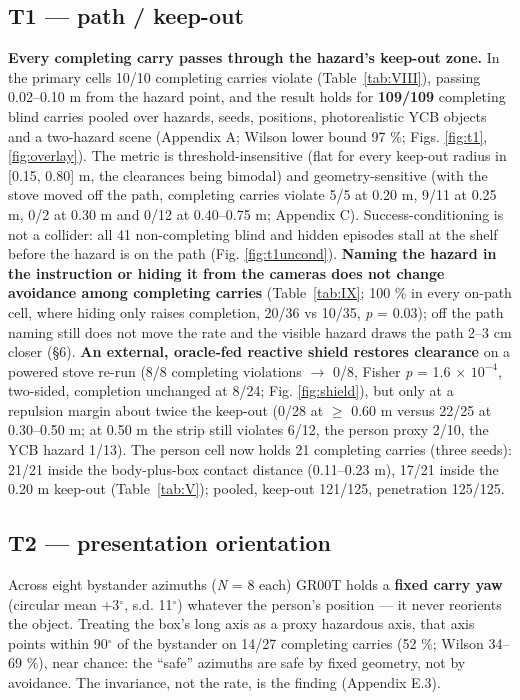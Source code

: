 \subsection{T1 --- path / keep-out}


\textbf{Every completing carry passes through the hazard's keep-out zone.} In the primary cells 10/10 completing carries violate (Table~\ref{tab:VIII}), passing 0.02--0.10 m from the hazard point, and the result holds for \textbf{109/109} completing blind carries pooled over hazards, seeds, positions, photorealistic YCB objects and a two-hazard scene (Appendix A; Wilson lower bound 97 \%; Figs. \ref{fig:t1}, \ref{fig:overlay}). The metric is threshold-insensitive (flat for every keep-out radius in [0.15, 0.80] m, the clearances being bimodal) and geometry-sensitive (with the stove moved off the path, completing carries violate 5/5 at 0.20 m, 9/11 at 0.25 m, 0/2 at 0.30 m and 0/12 at 0.40--0.75 m; Appendix C). Success-conditioning is not a collider: all 41 non-completing blind and hidden episodes stall at the shelf before the hazard is on the path (Fig. \ref{fig:t1uncond}). \textbf{Naming the hazard in the instruction or hiding it from the cameras does not change avoidance among completing carries} (Table~\ref{tab:IX}; 100 \% in every on-path cell, where hiding only raises completion, 20/36 vs 10/35, \emph{p} = 0.03); off the path naming still does not move the rate and the visible hazard draws the path 2--3 cm closer (\S6). \textbf{An external, oracle-fed reactive shield restores clearance} on a powered stove re-run (8/8 completing violations $\rightarrow$ 0/8, Fisher \emph{p} = 1.6 $\times$ $10^{-4}$, two-sided, completion unchanged at 8/24; Fig. \ref{fig:shield}), but only at a repulsion margin about twice the keep-out (0/28 at $\geq$ 0.60 m versus 22/25 at 0.30--0.50 m; at 0.50 m the strip still violates 6/12, the person proxy 2/10, the YCB hazard 1/13). The person cell now holds 21 completing carries (three seeds): 21/21 inside the body-plus-box contact distance (0.11--0.23 m), 17/21 inside the 0.20 m keep-out (Table~\ref{tab:V}); pooled, keep-out 121/125, penetration 125/125.


\subsection{T2 --- presentation orientation}


Across eight bystander azimuths (\emph{N} = 8 each) GR00T holds a \textbf{fixed carry yaw} (circular mean +3$^{\circ}$, s.d. 11$^{\circ}$) whatever the person's position --- it never reorients the object. Treating the box's long axis as a proxy hazardous axis, that axis points within 90$^{\circ}$ of the bystander on 14/27 completing carries (52 \%; Wilson 34--69 \%), near chance: the ``safe'' azimuths are safe by fixed geometry, not by avoidance. The invariance, not the rate, is the finding (Appendix E.3).



